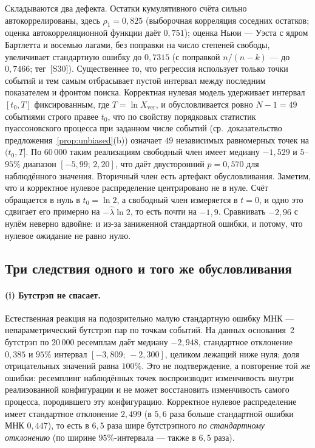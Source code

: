 \documentclass[11pt,a4paper]{article}
\theoremstyle{plain}
\theoremstyle{remark}
\begin{document}
Складываются два дефекта. Остатки кумулятивного счёта сильно автокоррелированы,
здесь $\rho_1=0{,}825$ (выборочная корреляция соседних остатков; оценка
автокорреляционной функции даёт $0{,}751$); оценка Ньюи --- Уэста с ядром Бартлетта
и восемью лагами, без поправки на число степеней свободы, увеличивает стандартную
ошибку до $0{,}7315$ (с поправкой $n/(n-k)$ --- до $0{,}7466$; тег~[S30]). Существеннее то, что регрессия использует
только точки событий и тем самым отбрасывает пустой интервал между последним показателем
и фронтом поиска. Корректная нулевая модель удерживает интервал $[t_0,T]$ фиксированным,
где $T=\ln X_{\mathrm{ver}}$, и обусловливается ровно $N-1=49$ событиями строго правее
$t_0$, что по свойству порядковых статистик пуассоновского процесса при
заданном числе событий (ср.\ доказательство предложения~\ref{prop:unbiased}(b))
означает $49$ независимых равномерных точек на $(t_0,T]$. По $60\,000$ таким реализациям свободный член имеет медиану $-1{,}529$ и
$5$--$95\%$ диапазон $[-5{,}99;\,2{,}20]$, что даёт двусторонний $p=0{,}570$ для
наблюдённого значения. Вторичный член есть артефакт обусловливания. Заметим, что и
корректное нулевое распределение центрировано не в нуле. Счёт обращается в нуль в
$t_0=\ln2$, а свободный член измеряется в $t=0$, и одно это сдвигает его
примерно на $-\hat\lambda\ln2$, то есть почти на $-1{,}9$. Сравнивать $-2{,}96$ с
нулём неверно вдвойне: и из-за заниженной стандартной ошибки, и потому, что
нулевое ожидание не равно нулю.

\subsection{Три следствия одного и того же обусловливания}

\paragraph{(i) Бутстрэп не спасает.} Естественная реакция на подозрительно малую
стандартную ошибку МНК --- непараметрический бутстрэп пар по точкам событий. На
данных основания~2
бутстрэп по $20\,000$ ресемплам даёт медиану $-2{,}948$, стандартное отклонение
$0{,}385$ и $95\%$ интервал $[-3{,}809;\,-2{,}300]$, целиком лежащий ниже нуля; доля
отрицательных значений равна $100\%$. Это не подтверждение, а повторение той же ошибки:
ресемплинг наблюдённых точек воспроизводит изменчивость внутри реализованной
конфигурации и не может восстановить изменчивость самого процесса, породившего эту
конфигурацию. Корректное нулевое распределение имеет стандартное отклонение $2{,}499$
(в $5{,}6$ раза больше стандартной ошибки МНК $0{,}447$),
то есть в $6{,}5$ раза шире бутстрэпного \emph{по стандартному отклонению}
(по ширине $95\%$-интервала --- также в $6{,}5$ раза).
\end{document}
